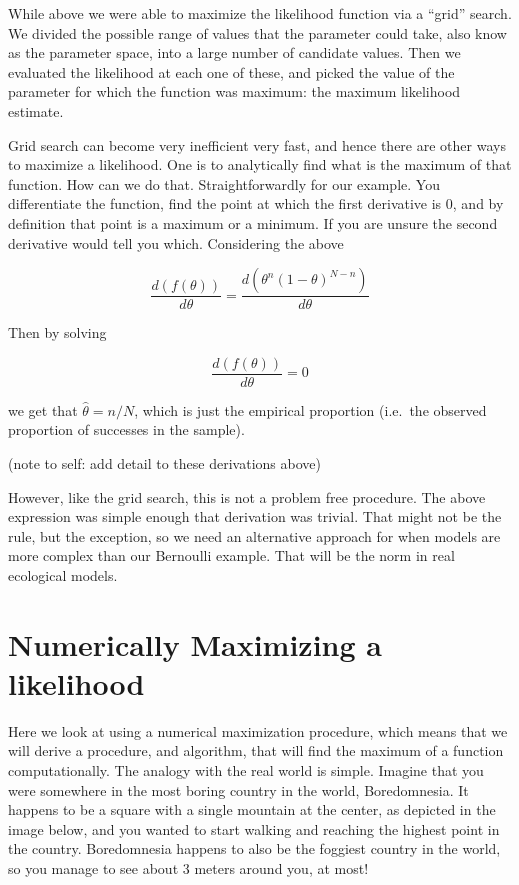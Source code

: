 \documentclass[
]{book}
\begin{document}
While above we were able to maximize the likelihood function via a ``grid'' search. We divided the possible range of values that the parameter could take, also know as the parameter space, into a large number of candidate values. Then we evaluated the likelihood at each one of these, and picked the value of the parameter for which the function was maximum: the maximum likelihood estimate.

Grid search can become very inefficient very fast, and hence there are other ways to maximize a likelihood. One is to analytically find what is the maximum of that function. How can we do that. Straightforwardly for our example. You differentiate the function, find the point at which the first derivative is 0, and by definition that point is a maximum or a minimum. If you are unsure the second derivative would tell you which. Considering the above

\[\frac{d(f(\theta))}{d \theta}=\frac{d(\theta^n (1-\theta)^{N-n})}{d \theta}\]

Then by solving

\[\frac{d(f(\theta))}{d \theta}=0\]

we get that \(\hat \theta = n/N\), which is just the empirical proportion (i.e.~the observed proportion of successes in the sample).

(note to self: add detail to these derivations above)

However, like the grid search, this is not a problem free procedure. The above expression was simple enough that derivation was trivial. That might not be the rule, but the exception, so we need an alternative approach for when models are more complex than our Bernoulli example. That will be the norm in real ecological models.

\hypertarget{numerically-maximizing-a-likelihood}{%
\section{Numerically Maximizing a likelihood}\label{numerically-maximizing-a-likelihood}}

Here we look at using a numerical maximization procedure, which means that we will derive a procedure, and algorithm, that will find the maximum of a function computationally. The analogy with the real world is simple. Imagine that you were somewhere in the most boring country in the world, Boredomnesia. It happens to be a square with a single mountain at the center, as depicted in the image below, and you wanted to start walking and reaching the highest point in the country. Boredomnesia happens to also be the foggiest country in the world, so you manage to see about 3 meters around you, at most!
\end{document}
